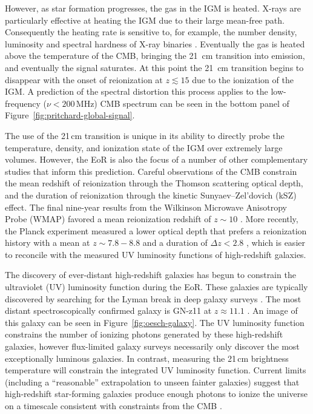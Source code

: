 \begin{bibunit}
However, as star formation progresses, the gas in the IGM is heated. X-rays are particularly
effective at heating the IGM due to their large mean-free path. Consequently the heating rate is
sensitive to, for example, the number density, luminosity and spectral hardness of X-ray binaries
\citep{2014MNRAS.437L..36F,2017MNRAS.472.2651G}.  Eventually the gas is heated above the temperature
of the CMB, bringing the 21~cm transition into emission, and eventually the signal saturates. At
this point the 21~cm transition begins to disappear with the onset of reionization at $z \lesssim
15$ due to the ionization of the IGM. A prediction of the spectral distortion this process applies
to the low-frequency ($\nu < 200\,\text{MHz}$) CMB spectrum can be seen in the bottom panel of
Figure~\ref{fig:pritchard-global-signal}.

The use of the 21\,cm transition is unique in its ability to directly probe the temperature,
density, and ionization state of the IGM over extremely large volumes. However, the EoR is also the
focus of a number of other complementary studies that inform this prediction. Careful observations
of the CMB constrain the mean redshift of reionization through the Thomson scattering optical depth,
and the duration of reionization through the kinetic Sunyaev--Zel'dovich (kSZ) effect. The final
nine-year results from the Wilkinson Microwave Anisotropy Probe (WMAP) favored a mean reionization
redshift of $z\sim10$ \citep{2013ApJS..208...19H}. More recently, the Planck experiment measured a
lower optical depth that prefers a reionization history with a mean at $z\sim7.8-8.8$ and a duration
of $\Delta z < 2.8$ \citep{2016A&A...596A.108P}, which is easier to reconcile with the measured UV
luminosity functions of high-redshift galaxies.

The discovery of ever-distant high-redshift galaxies has begun to constrain the ultraviolet (UV)
luminosity function during the EoR. These galaxies are typically discovered by searching for the
Lyman break in deep galaxy surveys \citep[pioneered by][]{1996ApJ...462L..17S}.  The most distant
spectroscopically confirmed galaxy is GN-z11 at $z\approx 11.1$ \citep{2016ApJ...819..129O}. An
image of this galaxy can be seen in Figure~\ref{fig:oesch-galaxy}.  The UV luminosity function
constrains the number of ionizing photons generated by these high-redshift galaxies, however
flux-limited galaxy surveys necessarily only discover the most exceptionally luminous galaxies. In
contrast, measuring the 21\,cm brightness temperature will constrain the integrated UV luminosity
function.  Current limits (including a ``reasonable'' extrapolation to unseen fainter galaxies)
suggest that high-redshift star-forming galaxies produce enough photons to ionize the universe on a
timescale consistent with constraints from the CMB \citep{2015ApJ...802L..19R}.


\end{bibunit}
